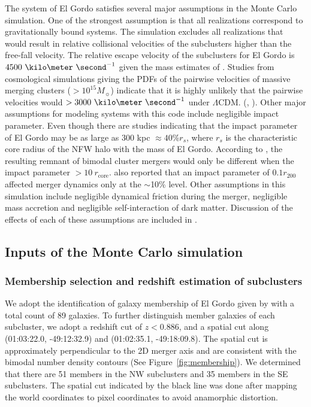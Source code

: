 The system of El Gordo satisfies several major assumptions in the Monte Carlo
simulation.
One of the strongest assumption is that all realizations correspond to
gravitationally bound systems. The simulation excludes all realizations
that would result in relative collisional velocities of the subclusters
higher than the free-fall velocity. The relative escape velocity of the
subclusters for El Gordo is $4500~\kilo\meter~\second^{-1}$ given
the mass estimates of \cite{Jee13} .  
Studies from cosmological simulations giving the PDFs of the pairwise velocities of massive merging clusters ($>
10^{15} M_{\sun}$) indicate that it is highly unlikely that the pairwise
velocities would $> 3000~\kilo \meter~\second^{-1}$ under $\Lambda$CDM.
(\citealt{Thompson12}, \citealt{Lee2010}).  Other major assumptions for
modeling systems with this code include negligible impact parameter. Even
though there are studies indicating that the impact parameter of El Gordo
may be as large as $300$ kpc $ \approx 40\% r_s$\citep{Molnar14},
where $r_s$ is the characteristic core
radius of the NFW halo with the mass of El Gordo. According to
\cite{Ricker98}, the resulting remnant of bimodal cluster mergers would only be
different when the impact parameter $> 10~ r_{\text{core}}$.
\cite{Maststropietro2008a} also reported that an impact parameter of $0.1
r_{200}$ affected merger dynamics only at the $\sim$10\% level.   
Other assumptions in this simulation include negligible dynamical friction
during the merger, negligible mass accretion and negligible self-interaction
of dark matter. Discussion of the effects of each of these assumptions are
included in .  
\par

\subsection{Inputs of the Monte Carlo simulation} \label{sec: inputs}
\setcounter{table}{0} 



\subsubsection{Membership selection and redshift estimation of subclusters}
%
We adopt the identification of galaxy membership of El Gordo given by
 with a total count of 89 galaxies.
To further distinguish member galaxies of each subcluster, we adopt a
redshift cut of $z < 0.886$, and a spatial cut along (01:03:22.0,
-49:12:32.9) and (01:02:35.1, -49:18:09.8). The spatial cut is approximately perpendicular
to the 2D merger axis and are consistent with the bimodal number density
contours (See Figure~\ref{fig:membership}). We determined that
there are 51 members in the NW subclusters and 35 members in the SE
subclusters. 
The spatial cut indicated by the black line was done after
mapping the world coordinates to pixel coordinates to avoid anamorphic
distortion.  

